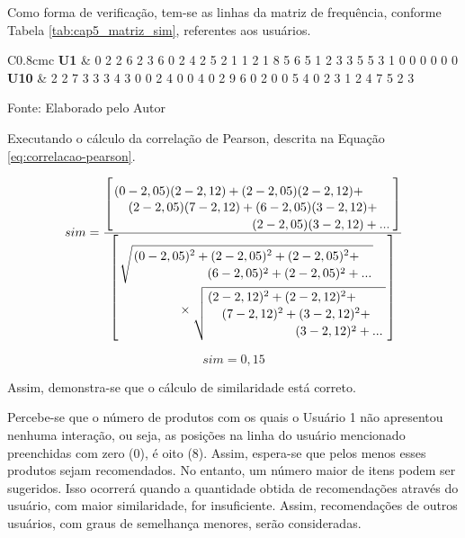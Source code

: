 Como forma de verificação, tem-se as linhas da matriz de frequência, conforme Tabela \ref{tab:cap5_matriz_sim}, referentes aos usuários.


\begin{table}[htb]
\caption{Matriz de frequências de interações}
\label{tab:cap5_matriz_sim}
\begin{tabular}{C{0.8cm}c}
\toprule
\textbf{U1} & 0 2  2  6  2  3  6  0  2  4  2  5  2  1  1  2  1  8  5  6  5  1  2  3  3  5  5  3  1  0  0  0  0  0  0 \\ \midrule
\textbf{U10} & 2  2  7  3  3  3  4  3  0  0  2  4  0  0  4  0  2  9  6  0  2  0  0  5  4  0  2  3  1  2  4  7  5  2  3 \\ \bottomrule
\end{tabular}

\footnotesize{Fonte: Elaborado pelo Autor}
\end{table}        

\newpage
Executando o cálculo da correlação de Pearson, descrita na Equação \ref{eq:correlacao-pearson}.

\begin{equation}
sim=\dfrac{\left[
\splitdfrac{
(0-2,05)(2-2,12)+
(2-2,05)(2-2,12)+
}
{\splitdfrac{
(2-2,05)(7-2,12)+
(6-2,05)(3-2,12)+
}{
(2-2,05)(3-2,12)+...}}\right]}
{
\left[
\splitdfrac{
\sqrt{\splitdfrac{(0-2,05)^2+
(2-2,05)^2+
(2-2,05)^2+
}{
(6-2,05)^2+
(2-2,05)^2+...}}
}{
\times\sqrt{\splitdfrac{(2-2,12)^2+
(2-2,12)^2+}{\splitdfrac{
(7-2,12)^2+
(3-2,12)^2+
}{
(3-2,12)^2+...}}}
}\right]
}
\nonumber
\end{equation}

\begin{equation}
sim = 0,15 \nonumber
\end{equation}

Assim, demonstra-se que o cálculo de similaridade está correto.

Percebe-se que o número de produtos com os quais o Usuário 1 não apresentou nenhuma interação, ou seja, as posições na linha do usuário mencionado preenchidas com zero (0), é oito (8). Assim, espera-se que pelos menos esses produtos sejam recomendados. 
No entanto, um número maior de itens podem ser sugeridos. Isso ocorrerá quando a quantidade obtida de recomendações através do usuário, com maior similaridade, for insuficiente. Assim, recomendações de outros usuários, com graus de semelhança menores, serão consideradas.

